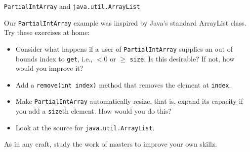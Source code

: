 \documentclass{beamer}
\begin{document}
\begin{frame}[fragile]{{\tt PartialIntArray} and {\tt java.util.ArrayList}}


Our {\tt PartialIntArray} example was inspired by Java's standard ArrayList class.  Try these exercises at home:
\begin{itemize}
\item Consider what happens if a user of {\tt PartialIntArray} supplies an out of bounds index to {\tt get}, i.e., $< 0$ or $\ge$ {\tt size}.  Is this desirable?  If not, how would you improve it?
\item Add a {\tt remove(int index)} method that removes the element at {\tt index}.
\item Make {\tt PartialIntArray} automatically resize, that is, expand its capacity if you add a {\tt size}th element.  How would you do this?
\item Look at the source for {\tt java.util.ArrayList}.
\begin{itemize}
\end{itemize}
\end{itemize}

As in any craft, study the work of masters to improve your own skillz.

\end{frame}






\end{document}
